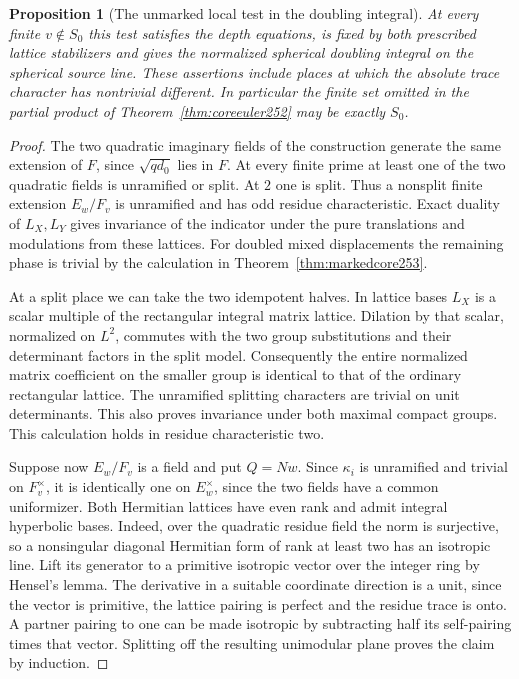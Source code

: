 \documentclass[a4paper,11pt]{article}
\newtheorem{proposition}{Proposition}[section]
\theoremstyle{definition}
\theoremstyle{remark}
\numberwithin{equation}{section}
\begin{document}
\begin{proposition}[The unmarked local test in the doubling integral]\leavevmode
\label{prop:vacuumcore254}
At every finite \(v\notin S_0\) this test satisfies the depth
equations, is fixed by both prescribed lattice stabilizers and
gives the normalized spherical doubling integral on the spherical
source line. These assertions include places at which the absolute
trace character has nontrivial different. In particular the finite
set omitted in the partial product of Theorem~\ref{thm:coreeuler252}
may be exactly \(S_0\).
\end{proposition}
\begin{proof}
The two quadratic imaginary fields of the construction generate
the same extension of \(F\), since \(\sqrt{q d_0}\) lies in \(F\).
At every finite prime at least one of the two quadratic fields
is unramified or split. At \(2\) one is split. Thus a nonsplit
finite extension \(E_w/F_v\) is unramified and has odd residue
characteristic. Exact duality of \(L_X,L_Y\) gives invariance of
the indicator under the pure translations and modulations from
these lattices. For doubled mixed displacements the remaining
phase is trivial by the calculation in Theorem~\ref{thm:markedcore253}.

At a split place we can take the two idempotent halves. In
lattice bases \(L_X\) is a scalar multiple of the rectangular
integral matrix lattice. Dilation by that scalar, normalized on
\(L^2\), commutes with the two group substitutions and their
determinant factors in the split model. Consequently the entire
normalized matrix coefficient on the smaller group is identical
to that of the ordinary rectangular lattice. The unramified
splitting characters are trivial on unit determinants. This also
proves invariance under both maximal compact groups. This
calculation holds in residue characteristic two.

Suppose now \(E_w/F_v\) is a field and put \(Q=Nw\). Since
\(\kappa_i\) is unramified and trivial on \(F_v^\times\), it is
identically one on \(E_w^\times\), since the two fields have a common
uniformizer. Both Hermitian lattices have even rank and admit
integral hyperbolic bases. Indeed, over the quadratic residue
field the norm is surjective, so a nonsingular diagonal
Hermitian form of rank at least two has an isotropic line.
Lift its generator to a primitive isotropic vector over the
integer ring by Hensel's lemma. The derivative in a suitable
coordinate direction is a unit, since the vector is primitive,
the lattice pairing is perfect and the residue trace is onto.
A partner pairing to one can be made isotropic by subtracting
half its self-pairing times that vector. Splitting off the
resulting unimodular plane proves the claim by induction.


\end{proof}
\end{document}
